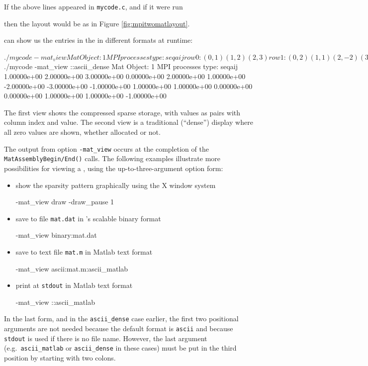 \begin{marginfigure}

\caption{A parallel \pMat layout on two processes.  Blank entries are not allocated.}
\label{fig:mpitwomatlayout}
\end{marginfigure}

If the above lines appeared in \texttt{mycode.c}, and if it were run
then the layout would be as in Figure \ref{fig:mpitwomatlayout}.

\PETSc can show us the entries in the \pMat in different formats at runtime:
\begin{cline}
$ ./mycode -mat_view
Mat Object: 1 MPI processes
  type: seqaij
row 0: (0, 1)  (1, 2)  (2, 3)
row 1: (0, 2)  (1, 1)  (2, -2)  (3, -3)
row 2: (0, -1)  (1, 1)  (2, 1)  (3, 0)
row 3: (1, 1)  (2, 1)  (3, -1)
$ ./mycode -mat_view ::ascii_dense
Mat Object: 1 MPI processes
  type: seqaij
 1.00000e+00  2.00000e+00  3.00000e+00  0.00000e+00
 2.00000e+00  1.00000e+00  -2.00000e+00  -3.00000e+00
 -1.00000e+00  1.00000e+00  1.00000e+00  0.00000e+00
 0.00000e+00  1.00000e+00  1.00000e+00  -1.00000e+00
\end{cline}
The first view shows the compressed sparse storage, with values as pairs with column index and value.  The second view is a traditional (``dense'') display where all zero values are shown, whether allocated or not.

The output from option \texttt{-mat\_view} occurs at the completion of the \texttt{MatAssemblyBegin/End()} calls.  The following examples illustrate more possibilities for viewing a \pMat, using the up-to-three-argument option form:\begin{itemize}
\item show the sparsity pattern graphically using the X window system
\begin{codeplain}
-mat_view draw -draw_pause 1
\end{codeplain}
\item save to file \texttt{mat.dat} in \PETSc's scalable binary format
\begin{codeplain}
-mat_view binary:mat.dat
\end{codeplain}
\item save to text file \texttt{mat.m} in Matlab text format
\begin{codeplain}
-mat_view ascii:mat.m:ascii_matlab
\end{codeplain}
\item print at \texttt{stdout} in Matlab text format
\begin{codeplain}
-mat_view ::ascii_matlab
\end{codeplain}
\end{itemize}
In the last form, and in the \texttt{ascii\_dense} case earlier, the first two positional arguments are not needed because the default format is \texttt{ascii} and because \texttt{stdout} is used if there is no file name.  However, the last argument (e.g.~\texttt{ascii\_matlab} or \texttt{ascii\_dense} in these cases) must be put in the third position by starting with two colons.


